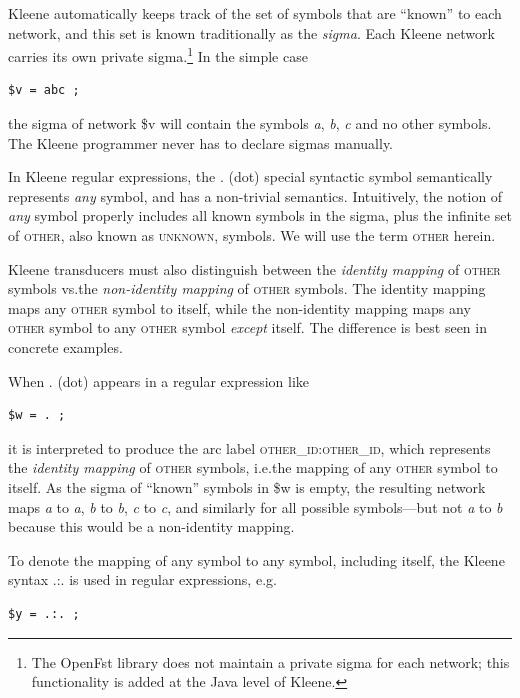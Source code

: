 \documentclass[letterpaper,12pt]{article}
\newcommand{\acro}{\textsc}
\begin{document}
Kleene automatically keeps track of the set of symbols that are ``known''
to each network, and this set is known traditionally as the \emph{sigma}.
Each Kleene network carries its own private sigma.\footnote{The OpenFst
library does not maintain a private sigma for each network; this
functionality is added at the Java level of Kleene.} In the simple case 

\begin{Verbatim}[fontsize=\small]
$v = abc ;
\end{Verbatim}

\noindent
the sigma of network \$v will contain the symbols \emph{a}, \emph{b},
\emph{c} and no other symbols.  The Kleene programmer never has to
declare sigmas manually.

In Kleene regular expressions, the . (dot) special syntactic symbol
semantically represents \emph{any} symbol, and has a non-trivial
semantics.  Intuitively, the notion of \emph{any} symbol properly
includes all known symbols in the sigma, plus the infinite set of
\acro{other}, also known as \acro{unknown}, symbols.  We will use the
term \acro{other} herein. 

Kleene transducers must also distinguish between the \emph{identity
mapping} of \acro{other} symbols vs.\@ the \emph{non-identity mapping} of
\acro{other} symbols.  The identity mapping maps any \acro{other} symbol
to itself, while the non-identity mapping maps any \acro{other} symbol to
any \acro{other} symbol \emph{except} itself.  The difference is best
seen in concrete examples.


When . (dot) appears in a regular expression like

\begin{Verbatim}[fontsize=\small]
$w = . ;
\end{Verbatim}

\noindent
it is interpreted to produce the arc label
\acro{other\_id}:\acro{other\_id}, which represents the \emph{identity
mapping} of \acro{other} symbols, i.e.\@ the mapping of any \acro{other}
symbol to itself.  As the sigma of ``known'' symbols in \$w is empty, the
resulting network maps \emph{a} to \emph{a}, \emph{b} to \emph{b},
\emph{c} to \emph{c}, and similarly for all possible symbols---but not
\emph{a} to \emph{b} because this would be a non-identity mapping.

To denote the mapping of any symbol to any symbol, including itself, the
Kleene syntax .:. is used in regular expressions, e.g.

\begin{Verbatim}[fontsize=\small]
$y = .:. ;
\end{Verbatim}
\end{document}
